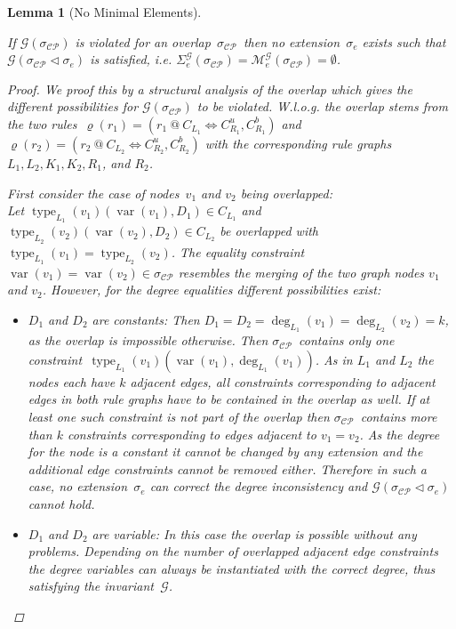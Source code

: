 \documentclass{tlp}
\newtheorem{lemma}[theorem]{Lemma}
\newcommand{\mcCP}{\ensuremath{\mathcal{CP}}}
\newcommand{\mcG}{\ensuremath{\mathcal{G}}}
\newcommand{\extend}{\ensuremath{\lhd}}
\newcommand{\mcp}{\ensuremath{\mathcal{M}^\mcG_e(\sigma_{\mcCP})}}
\newcommand{\sigcp}{\ensuremath{\sigma_{\mcCP}}}
\DeclareMathOperator{\var}{var}
\DeclareMathOperator{\type}{type}
\newcommand{\chrrule}{\ensuremath{\varrho}}
\begin{document}
\begin{lemma}[No Minimal Elements]\label{lem:obs_confl_empty_M}

If $\mcG(\sigcp)$ is violated for an overlap~\sigcp\ then no extension~$\sigma_e$
exists such that $\mcG(\sigcp \extend \sigma_e)$ is satisfied, i.e.
$\Sigma_e^{\mcG}(\sigcp) = \mcp = \emptyset$.

\begin{proof}
We proof this by a structural analysis of the overlap which gives the different
possibilities for $\mathcal{G}(\sigma_{\mathcal{CP}})$ to be violated. W.l.o.g.
the overlap stems from the two rules~$\chrrule(r_1) = (r_1\ @\ C_{L_1}
\Leftrightarrow C_{R_1}^u,C_{R_1}^b)$ and $\chrrule(r_2) = (r_2\ @\ C_{L_2}
\Leftrightarrow C_{R_2}^u,C_{R_2}^b)$ with the corresponding rule graphs
$L_1,L_2,K_1,K_2,R_1$, and $R_2$.

First consider the case of nodes~$v_1$ and $v_2$ being overlapped:\\
Let $\type_{L_1}(v_1)(\var(v_1), D_1) \in C_{L_1}$ and
$\type_{L_2}(v_2)(\var(v_2), D_2) \in C_{L_2}$ be overlapped with
$\type_{L_1}(v_1) = \type_{L_2}(v_2)$. The equality constraint $\var(v_1) =
\var(v_2) \in \sigcp$ resembles the merging of the two graph nodes $v_1$ and
$v_2$. However, for the degree equalities different possibilities exist:

\begin{itemize}

  \item $D_1$ and $D_2$ are constants: Then $D_1 = D_2 = \deg_{L_1}(v_1) =
  \deg_{L_2}(v_2) = k$, as the overlap is impossible otherwise. Then \sigcp\
  contains only one constraint~$\type_{L_1}(v_1)(\var(v_1), \deg_{L_1}(v_1))$. As
  in $L_1$ and $L_2$ the nodes each have $k$ adjacent edges, all constraints
  corresponding to adjacent edges in both rule graphs have to be contained in the
  overlap as well. If at least one such constraint is not part of the overlap
  then \sigcp\ contains more than $k$ constraints corresponding to edges adjacent
  to $v_1 = v_2$. As the degree for the node is a constant it cannot be changed
  by any extension and the additional edge constraints cannot be removed either.
  Therefore in such a case, no extension~$\sigma_e$ can correct the degree
  inconsistency and $\mcG(\sigcp \extend \sigma_e)$ cannot hold.

  \item $D_1$ and $D_2$ are variable: In this case the overlap is possible
  without any problems. Depending on the number of overlapped adjacent edge
  constraints the degree variables can always be instantiated with the correct
  degree, thus satisfying the invariant~\mcG.


\end{itemize}
\end{proof}
\end{lemma}
\end{document}
